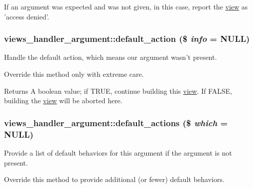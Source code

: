 If an argument was expected and was not given, in this case, report the \hyperlink{classview}{view} as 'access denied'. \hypertarget{classviews__handler__argument_a6c4d14fd0c639184162d7d684a2e04a6}{
\subsubsection[{default\_\-action}]{\setlength{\rightskip}{0pt plus 5cm}views\_\-handler\_\-argument::default\_\-action (\$ {\em info} = {\ttfamily NULL})}}
\label{classviews__handler__argument_a6c4d14fd0c639184162d7d684a2e04a6}
Handle the default action, which means our argument wasn't present.

Override this method only with extreme care.

\begin{DoxyReturn}{Returns}
A boolean value; if TRUE, continue building this \hyperlink{classview}{view}. If FALSE, building the \hyperlink{classview}{view} will be aborted here. 
\end{DoxyReturn}
\hypertarget{classviews__handler__argument_abf38ef334b6e18e0aa43e5a829e3ce33}{
\subsubsection[{default\_\-actions}]{\setlength{\rightskip}{0pt plus 5cm}views\_\-handler\_\-argument::default\_\-actions (\$ {\em which} = {\ttfamily NULL})}}
\label{classviews__handler__argument_abf38ef334b6e18e0aa43e5a829e3ce33}
Provide a list of default behaviors for this argument if the argument is not present.

Override this method to provide additional (or fewer) default behaviors. 

